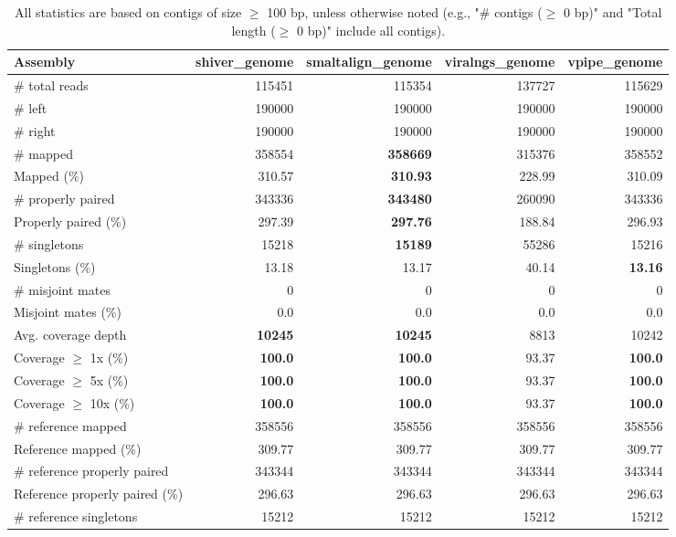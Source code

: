 \documentclass[12pt,a4paper]{article}
\begin{document}
\begin{table}[ht]
\begin{center}
\caption{All statistics are based on contigs of size $\geq$ 100 bp, unless otherwise noted (e.g., "\# contigs ($\geq$ 0 bp)" and "Total length ($\geq$ 0 bp)" include all contigs).}
\begin{tabular}{|l*{4}{|r}|}
\hline
Assembly & shiver\_genome & smaltalign\_genome & viralngs\_genome & vpipe\_genome \\ \hline
\# total reads & 115451 & 115354 & 137727 & 115629 \\ \hline
\# left & 190000 & 190000 & 190000 & 190000 \\ \hline
\# right & 190000 & 190000 & 190000 & 190000 \\ \hline
\# mapped & 358554 & {\bf 358669} & 315376 & 358552 \\ \hline
Mapped (\%) & 310.57 & {\bf 310.93} & 228.99 & 310.09 \\ \hline
\# properly paired & 343336 & {\bf 343480} & 260090 & 343336 \\ \hline
Properly paired (\%) & 297.39 & {\bf 297.76} & 188.84 & 296.93 \\ \hline
\# singletons & 15218 & {\bf 15189} & 55286 & 15216 \\ \hline
Singletons (\%) & 13.18 & 13.17 & 40.14 & {\bf 13.16} \\ \hline
\# misjoint mates & 0 & 0 & 0 & 0 \\ \hline
Misjoint mates (\%) & 0.0 & 0.0 & 0.0 & 0.0 \\ \hline
Avg. coverage depth & {\bf 10245} & {\bf 10245} & 8813 & 10242 \\ \hline
Coverage $\geq$ 1x (\%) & {\bf 100.0} & {\bf 100.0} & 93.37 & {\bf 100.0} \\ \hline
Coverage $\geq$ 5x (\%) & {\bf 100.0} & {\bf 100.0} & 93.37 & {\bf 100.0} \\ \hline
Coverage $\geq$ 10x (\%) & {\bf 100.0} & {\bf 100.0} & 93.37 & {\bf 100.0} \\ \hline
\# reference mapped & 358556 & 358556 & 358556 & 358556 \\ \hline
Reference mapped (\%) & 309.77 & 309.77 & 309.77 & 309.77 \\ \hline
\# reference properly paired & 343344 & 343344 & 343344 & 343344 \\ \hline
Reference properly paired (\%) & 296.63 & 296.63 & 296.63 & 296.63 \\ \hline
\# reference singletons & 15212 & 15212 & 15212 & 15212 \\ \hline

\end{tabular}
\end{center}
\end{table}
\end{document}
